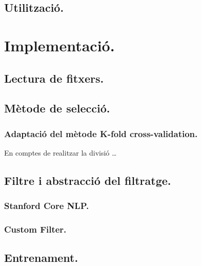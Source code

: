 \documentclass[]{article}
\begin{document}
\hypertarget{utilitzacio.}{%
\subsection{Utilització.}\label{utilitzacio.}}

\hypertarget{implementacio.}{%
\section{Implementació.}\label{implementacio.}}

\hypertarget{lectura-de-fitxers.}{%
\subsection{Lectura de fitxers.}\label{lectura-de-fitxers.}}

\hypertarget{metode-de-seleccio.}{%
\subsection{Mètode de selecció.}\label{metode-de-seleccio.}}

\hypertarget{adaptacio-del-metode-k-fold-cross-validation.}{%
\subsubsection{Adaptació del mètode K-fold
cross-validation.}\label{adaptacio-del-metode-k-fold-cross-validation.}}

En comptes de realitzar la divisió \ldots{}

\hypertarget{filtre-i-abstraccio-del-filtratge.}{%
\subsection{Filtre i abstracció del
filtratge.}\label{filtre-i-abstraccio-del-filtratge.}}

\hypertarget{stanford-core-nlp.}{%
\subsubsection{Stanford Core NLP.}\label{stanford-core-nlp.}}

\hypertarget{custom-filter.}{%
\subsubsection{Custom Filter.}\label{custom-filter.}}

\hypertarget{entrenament.}{%
\subsection{Entrenament.}\label{entrenament.}}
\end{document}
